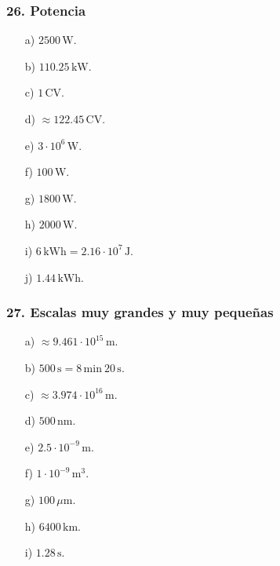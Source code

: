 \subsubsection*{26. Potencia}
\begin{enumerate}
    \item[a)] $2500\,\mathrm{W}$.
    \item[b)] $110.25\,\mathrm{kW}$.
    \item[c)] $1\,\mathrm{CV}$.
    \item[d)] $\approx122.45\,\mathrm{CV}$.
    \item[e)] $3\cdot10^6\,\mathrm{W}$.
    \item[f)] $100\,\mathrm{W}$.
    \item[g)] $1800\,\mathrm{W}$.
    \item[h)] $2000\,\mathrm{W}$.
    \item[i)] $6\,\mathrm{kWh}=2.16\cdot10^7\,\mathrm{J}$.
    \item[j)] $1.44\,\mathrm{kWh}$.
\end{enumerate}

\subsubsection*{27. Escalas muy grandes y muy pequeñas}
\begin{enumerate}
    \item[a)] $\approx9.461\cdot10^{15}\,\mathrm{m}$.
    \item[b)] $500\,\mathrm{s}=8\,\mathrm{min}\ 20\,\mathrm{s}$.
    \item[c)] $\approx3.974\cdot10^{16}\,\mathrm{m}$.
    \item[d)] $500\,\mathrm{nm}$.
    \item[e)] $2.5\cdot10^{-9}\,\mathrm{m}$.
    \item[f)] $1\cdot10^{-9}\,\mathrm{m^3}$.
    \item[g)] $100\,\mu\mathrm{m}$.
    \item[h)] $6400\,\mathrm{km}$.
    \item[i)] $1.28\,\mathrm{s}$.
\end{enumerate}

